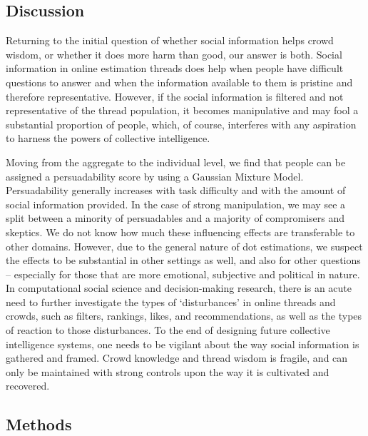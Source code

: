 \documentclass[9pt,a4paper,twocolumn,lineno]{article}
\begin{document}
\subsection*{Discussion}
Returning to the initial question of whether social information helps crowd wisdom, or whether it does more harm than good, our answer is both. Social information in online estimation threads does help when people have difficult questions to answer and when the information available to them is pristine and therefore representative. However, if the social information is filtered and not representative of the thread population, it becomes manipulative and may fool a substantial proportion of people, which, of course, interferes with any aspiration to harness the powers of collective intelligence. 

Moving from the aggregate to the individual level, we find that people can be assigned a persuadability score by using a Gaussian Mixture Model. Persuadability generally increases with task difficulty and with the amount of social information provided. In the case of strong manipulation, we may see a split between a minority of persuadables and a majority of compromisers and skeptics. We do not know how much these influencing effects are transferable to other domains. However, due to the general nature of dot estimations, we suspect the effects to be substantial in other settings as well, and also for other questions – especially for those that are more emotional, subjective and political in nature. In computational social science and decision-making research,  there is an acute need to further investigate the types of ‘disturbances’ in online threads and crowds, such as filters, rankings, likes, and recommendations, as well as the types of reaction to those disturbances. To the end of designing future collective intelligence systems, one needs to be vigilant about the way social information is gathered and framed. Crowd knowledge and thread wisdom is fragile, and can only be maintained with strong controls upon the way it is cultivated and recovered.

\subsection*{Methods}\scriptsize
\end{document}
